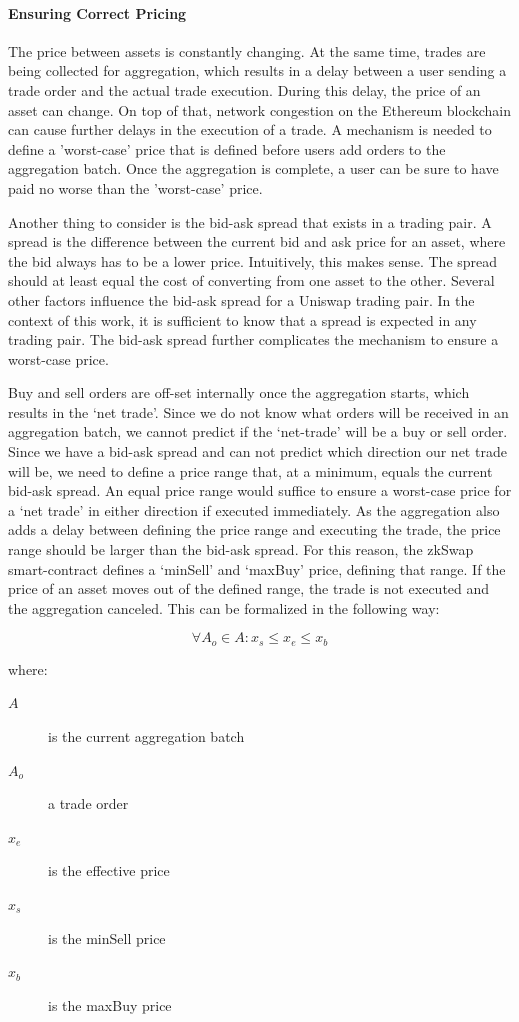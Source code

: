 \documentclass[../../thesis.tex]{subfiles}
\begin{document}
\paragraph{Ensuring Correct Pricing}
The price between assets is constantly changing. At the same time, trades are being collected for aggregation, which results in a delay between a user sending a trade order and the actual trade execution. During this delay, the price of an asset can change. On top of that, network congestion on the Ethereum blockchain can cause further delays in the execution of a trade. A mechanism is needed to define a 'worst-case' price that is defined before users add orders to the aggregation batch. Once the aggregation is complete, a user can be sure to have paid no worse than the 'worst-case' price.

Another thing to consider is the bid-ask spread that exists in a trading pair. A spread is the difference between the current bid and ask price for an asset, where the bid always has to be a lower price. Intuitively, this makes sense. The spread should at least equal the cost of converting from one asset to the other. Several other factors influence the bid-ask spread for a Uniswap trading pair. In the context of this work, it is sufficient to know that a spread is expected in any trading pair. The bid-ask spread further complicates the mechanism to ensure a worst-case price. 

Buy and sell orders are off-set internally once the aggregation starts, which results in the `net trade'. Since we do not know what orders will be received in an aggregation batch, we cannot predict if the `net-trade' will be a buy or sell order. Since we have a bid-ask spread and can not predict which direction our net trade will be, we need to define a price range that, at a minimum, equals the current bid-ask spread. An equal price range would suffice to ensure a worst-case price for a `net trade' in either direction if executed immediately.
As the aggregation also adds a delay between defining the price range and executing the trade, the price range should be larger than the bid-ask spread. For this reason, the zkSwap smart-contract defines a `minSell' and `maxBuy' price, defining that range. If the price of an asset moves out of the defined range, the trade is not executed and the aggregation canceled. This can be formalized in the following way: 

$$\forall A_o\in A: x_s \leq x_e \leq x_b$$


where:
\begin{description}
\item[$A$] is the current aggregation batch
\item[$A_o$] a trade order
\item[$x_e$] is the effective price 
\item[$x_s$] is the minSell price
\item[$x_b$] is the maxBuy price 
\end{description}
\end{document}
